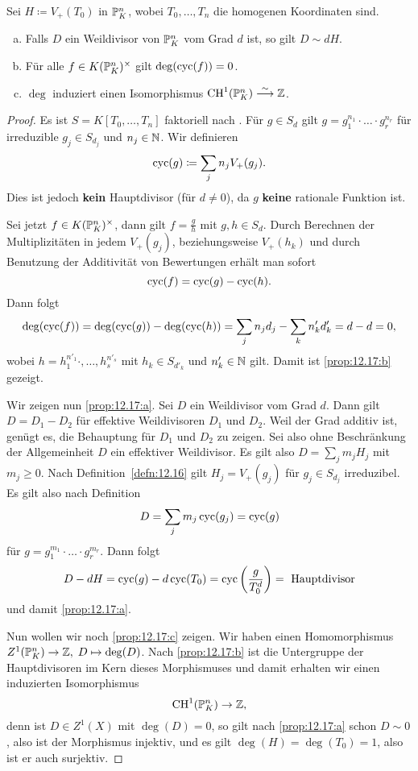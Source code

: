 \begin{prop}
\label{prop:12.17}
	Sei $H \coloneqq V_+(T_0)$ in $\P^n_K$, wobei $T_0,\ldots,T_n$ die homogenen Koordinaten sind.
	\begin{enumerate}[a)]
		\item\label{prop:12.17:a} Falls $D$ ein Weildivisor von $\P^n_K$ vom Grad $d$ ist, so gilt $D\sim dH$.
		\item\label{prop:12.17:b} Für alle $f \in K(\P^n_K)^\times$ gilt $\deg(\cyc(f)) = 0$.
		\item\label{prop:12.17:c} $\deg$ induziert einen Isomorphismus $\CH^1(\P^n_K)\simto \Z$.
	\end{enumerate}
	\begin{proof}
		Es ist $S=K[T_0,\ldots,T_n]$ faktoriell nach \cite[Theorem~A.3]{gubler2014vorlesungsskript}. Für $g \in S_d$ gilt $g=g_1^{n_1}\cdot \ldots \cdot g_r^{n_r}$ für irreduzible $g_j\in S_{d_j}$ und $n_j \in \N$. Wir definieren
		\[
			\cyc(g)\coloneqq \sum_{j}n_jV_+(g_j).
		\]
		Dies ist jedoch \textbf{kein} Hauptdivisor (für $d \ne 0$), da $g$ \textbf{keine} rationale Funktion ist.

		Sei jetzt $f\in K(\P^n_K)^\times$, dann gilt $f=\frac{g}{h}$ mit $g,h\in S_d$. Durch Berechnen der Multiplizitäten in jedem $V_+(g_j)$, beziehungsweise $V_+(h_k)$ und durch Benutzung der Additivität von Bewertungen erhält man sofort
		\[
			\cyc(f) = \cyc(g) - \cyc(h).
		\]
		Dann folgt
		\[
			\deg(\cyc(f)) = \deg(\cyc(g)) - \deg(\cyc(h)) = \sum_j n_j d_j - \sum_k n_k'd_k' = d - d = 0,
		\]
		wobei $h = h_1^{n'_1}\cdot,\ldots,h_s^{n'_s}$ mit $h_k \in S_{d'_k}$ und $n'_k \in \N$ gilt. Damit ist \ref{prop:12.17:b} gezeigt.

		Wir zeigen nun \ref{prop:12.17:a}. Sei $D$ ein Weildivisor vom Grad $d$. Dann gilt $D=D_1-D_2$ für effektive Weildivisoren $D_1$ und $D_2$. Weil der Grad additiv ist, genügt es, die Behauptung für $D_1$ und $D_2$ zu zeigen. Sei also ohne Beschränkung der Allgemeinheit $D$ ein effektiver Weildivisor. Es gilt also $D = \sum_{j} m_j H_j$ mit $m_j\ge 0$. Nach Definition~\ref{defn:12.16} gilt $H_j=V_+(g_j)$ für $g_j \in S_{d_j}$ irreduzibel. Es gilt also nach Definition
		\[
			D = \sum_{j}m_j \cyc(g_j) = \cyc(g)
		\]
		für $g = g_1^{m_1}\cdot \ldots \cdot g_r^{m_r}$. Dann folgt
		\[
			D-dH = \cyc(g) - d \cyc(T_0) = \cyc\left(\frac{g}{T_0^d}\right) = \text{ Hauptdivisor}
		\]
		und damit \ref{prop:12.17:a}.

		Nun wollen wir noch \ref{prop:12.17:c} zeigen. Wir haben einen Homomorphismus $Z^1(\P^n_K) \to \Z,\; D \mapsto \deg(D)$. Nach \ref{prop:12.17:b} ist die Untergruppe der Hauptdivisoren im Kern dieses Morphismuses und damit erhalten wir einen induzierten Isomorphismus
		\[
			\CH^1(\P^n_K)\to \Z,
		\]
		denn ist $D \in Z^1(X)$ mit $\deg(D) = 0$, so gilt nach \ref{prop:12.17:a} schon $D \sim 0$, also ist der Morphismus injektiv, und es gilt $\deg(H) = \deg(T_0)=1$, also ist er auch surjektiv.
	\end{proof}
\end{prop}


